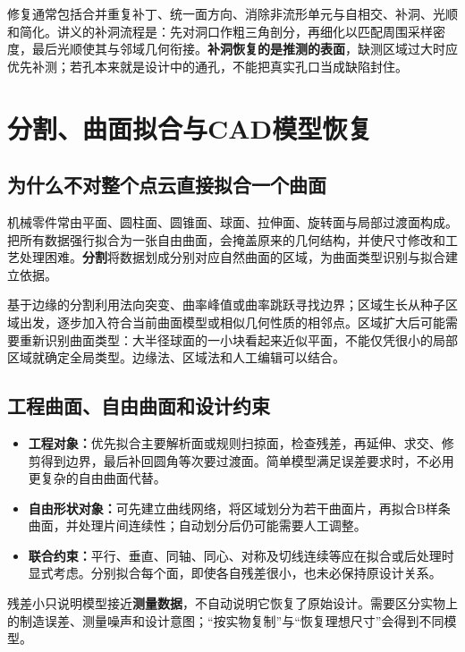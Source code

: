 修复通常包括合并重复补丁、统一面方向、消除非流形单元与自相交、补洞、光顺和简化。讲义的补洞流程是：先对洞口作粗三角剖分，再细化以匹配周围采样密度，最后光顺使其与邻域几何衔接。\textbf{补洞恢复的是推测的表面}，缺测区域过大时应优先补测；若孔本来就是设计中的通孔，不能把真实孔口当成缺陷封住。

\section{分割、曲面拟合与CAD模型恢复}
\subsection{为什么不对整个点云直接拟合一个曲面}
机械零件常由平面、圆柱面、圆锥面、球面、拉伸面、旋转面与局部过渡面构成。把所有数据强行拟合为一张自由曲面，会掩盖原来的几何结构，并使尺寸修改和工艺处理困难。\textbf{分割}将数据划成分别对应自然曲面的区域，为曲面类型识别与拟合建立依据。

基于边缘的分割利用法向突变、曲率峰值或曲率跳跃寻找边界；区域生长从种子区域出发，逐步加入符合当前曲面模型或相似几何性质的相邻点。区域扩大后可能需要重新识别曲面类型：大半径球面的一小块看起来近似平面，不能仅凭很小的局部区域就确定全局类型。边缘法、区域法和人工编辑可以结合。

\subsection{工程曲面、自由曲面和设计约束}
\begin{itemize}
\item \textbf{工程对象：}优先拟合主要解析面或规则扫掠面，检查残差，再延伸、求交、修剪得到边界，最后补回圆角等次要过渡面。简单模型满足误差要求时，不必用更复杂的自由曲面代替。
\item \textbf{自由形状对象：}可先建立曲线网络，将区域划分为若干曲面片，再拟合B样条曲面，并处理片间连续性；自动划分后仍可能需要人工调整。
\item \textbf{联合约束：}平行、垂直、同轴、同心、对称及切线连续等应在拟合或后处理时显式考虑。分别拟合每个面，即使各自残差很小，也未必保持原设计关系。
\end{itemize}

残差小只说明模型接近\textbf{测量数据}，不自动说明它恢复了原始设计。需要区分实物上的制造误差、测量噪声和设计意图；“按实物复制”与“恢复理想尺寸”会得到不同模型。


